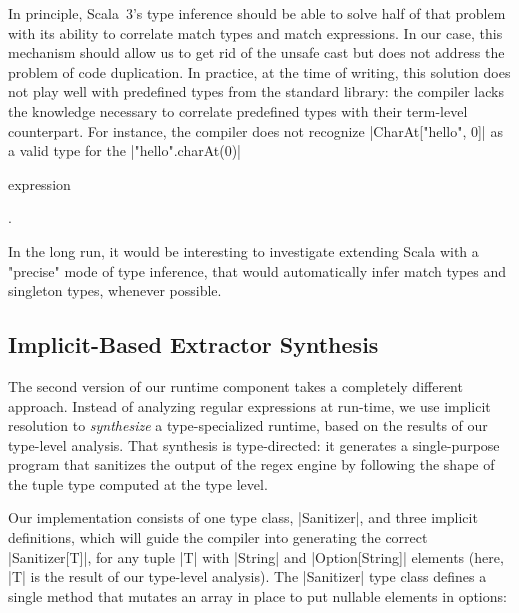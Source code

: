 In principle, Scala~3's type inference should be able to solve half of that problem with its ability to correlate match types and match expressions.%
%
In our case, this mechanism should allow us to get rid of the unsafe cast but does not address the problem of code duplication.
In practice, at the time of writing, this solution does not play well with predefined types from the standard library: the compiler lacks the knowledge necessary to correlate predefined types with their term-level counterpart.
For instance, the compiler does not recognize |CharAt["hello", 0]| as a valid type for the |"hello".charAt(0)| \begin{diff}expression\end{diff}.

In the long run, it would be interesting to investigate extending Scala with a "precise" mode of type inference, that would automatically infer match types and singleton types, whenever possible.

\subsection{Implicit-Based Extractor Synthesis}
\label{subsec:implicit-based-extractor-synthesis}

The second version of our runtime component takes a completely different approach.
Instead of analyzing regular expressions at run-time, we use implicit resolution to \emph{synthesize} a type-specialized runtime, based on the results of our type-level analysis.
That synthesis is type-directed: it generates a single-purpose program that sanitizes the output of the regex engine by following the shape of the tuple type computed at the type level.

Our implementation consists of one type class, |Sanitizer|, and three implicit definitions, which will guide the compiler into generating the correct |Sanitizer[T]|, for any tuple |T| with |String| and |Option[String]| elements (here, |T| is the result of our type-level analysis).
The |Sanitizer| type class defines a single method that mutates an array in place to put nullable elements in options:

